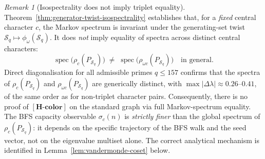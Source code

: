\documentclass[11pt,a4paper]{article}
\theoremstyle{definition}
\theoremstyle{remark}
\newtheorem{remark}[theorem]{Remark}
\newcommand{\Hcolor}{\mathbf{[H\text{-}color]}}
\newcommand{\Sq}{\mathcal{S}_q}
\begin{document}
      \begin{remark}[Isospectrality does not imply triplet equality]
        \label{rmk:no-spectral-proof}
        Theorem~\ref{thm:generator-twist-isospectrality} establishes that, for a \emph{fixed}
        central character $c$, the Markov spectrum is invariant under the generating-set twist
        $\Sq \mapsto \phi_\omega(\Sq)$.
        It does \emph{not} imply equality of spectra across distinct central characters:
        \begin{equation}
          \operatorname{spec}\bigl(\rho_c(P_{\Sq})\bigr)
          \;\neq\;
          \operatorname{spec}\bigl(\rho_{\omega c}(P_{\Sq})\bigr)
          \quad \text{in general.}
        \end{equation}
        Direct diagonalisation for all admissible primes $q \leq 157$ confirms that the spectra of
        $\rho_c(P_{\Sq})$ and $\rho_{\omega c}(P_{\Sq})$ are generically distinct, with
        $\max|\Delta\lambda| \approx 0.26$--$0.41$, of the same order as for non-triplet character pairs.
        Consequently, there is no proof of $\Hcolor$ on the standard graph via full Markov-spectrum
        equality.
        The BFS capacity observable $\sigma_c(n)$ is \emph{strictly finer} than the global spectrum of
        $\rho_c(P_{\Sq})$: it depends on the specific trajectory of the BFS walk and the seed vector,
        not on the eigenvalue multiset alone.
        The correct analytical mechanism is identified in Lemma~\ref{lem:vandermonde-coset} below.
      \end{remark}
\end{document}
